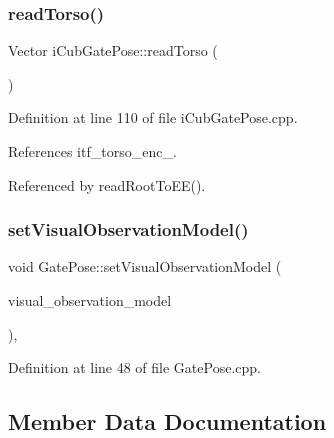\subsubsection{\texorpdfstring{read\+Torso()}{readTorso()}}
{\footnotesize\ttfamily Vector i\+Cub\+Gate\+Pose\+::read\+Torso (\begin{DoxyParamCaption}{ }\end{DoxyParamCaption})\hspace{0.3cm}{\ttfamily [protected]}}



Definition at line 110 of file i\+Cub\+Gate\+Pose.\+cpp.



References itf\+\_\+torso\+\_\+enc\+\_\+.



Referenced by read\+Root\+To\+E\+E().

\mbox{\label{classGatePose_a18ba358c801ae1a246dbee2f9780c698}} 
\subsubsection{\texorpdfstring{set\+Visual\+Observation\+Model()}{setVisualObservationModel()}}
{\footnotesize\ttfamily void Gate\+Pose\+::set\+Visual\+Observation\+Model (\begin{DoxyParamCaption}\item[{std\+::unique\+\_\+ptr$<$ bfl\+::\+Visual\+Observation\+Model $>$}]{visual\+\_\+observation\+\_\+model }\end{DoxyParamCaption})\hspace{0.3cm}{\ttfamily [override]}, {\ttfamily [inherited]}}



Definition at line 48 of file Gate\+Pose.\+cpp.



\subsection{Member Data Documentation}
\mbox{\label{classiCubGatePose_ab365d41c45121ee8ec048506f952d252}} 
